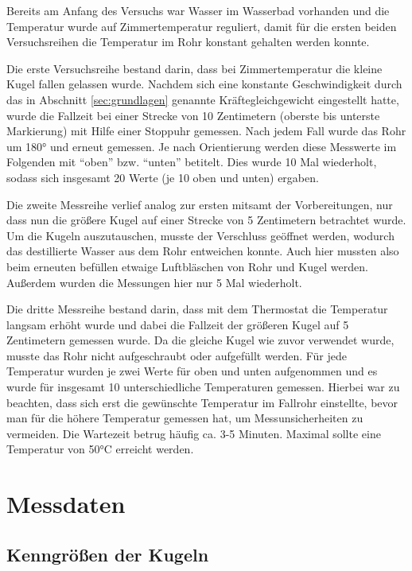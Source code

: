 Bereits am Anfang des Versuchs war Wasser im Wasserbad vorhanden und die Temperatur wurde auf Zimmertemperatur reguliert,
damit für die ersten beiden Versuchsreihen die Temperatur im Rohr konstant gehalten werden konnte.

Die erste Versuchsreihe bestand darin, dass bei Zimmertemperatur die kleine Kugel fallen gelassen wurde.
Nachdem sich eine konstante Geschwindigkeit durch das in Abschnitt \ref{sec:grundlagen} genannte Kräftegleichgewicht eingestellt hatte,
wurde die Fallzeit bei einer Strecke von 10 Zentimetern (oberste bis unterste Markierung)
mit Hilfe einer Stoppuhr gemessen.
Nach jedem Fall wurde das Rohr um 180° und erneut gemessen.
Je nach Orientierung werden diese Messwerte im Folgenden mit \enquote{oben} bzw. \enquote{unten} betitelt.
Dies wurde 10 Mal wiederholt, sodass sich insgesamt 20 Werte (je 10 oben und unten) ergaben.

Die zweite Messreihe verlief analog zur ersten mitsamt der Vorbereitungen, nur dass nun die größere Kugel auf einer Strecke von 5 Zentimetern betrachtet wurde.
Um die Kugeln auszutauschen, musste der Verschluss geöffnet werden, wodurch das destillierte Wasser aus dem Rohr entweichen konnte.
Auch hier mussten also beim erneuten befüllen etwaige Luftbläschen von Rohr und Kugel werden.
Außerdem wurden die Messungen hier nur 5 Mal wiederholt.

Die dritte Messreihe bestand darin, dass mit dem Thermostat die Temperatur langsam erhöht wurde
und dabei die Fallzeit der größeren Kugel auf 5 Zentimetern gemessen wurde.
Da die gleiche Kugel wie zuvor verwendet wurde, musste das Rohr nicht aufgeschraubt oder aufgefüllt werden.
Für jede Temperatur wurden je zwei Werte für oben und unten aufgenommen und es wurde für insgesamt 10 unterschiedliche Temperaturen gemessen.
Hierbei war zu beachten, dass sich erst die gewünschte Temperatur im Fallrohr einstellte, bevor man für die höhere Temperatur gemessen hat, 
um Messunsicherheiten zu vermeiden. Die Wartezeit betrug häufig ca. 3-5 Minuten. Maximal sollte eine Temperatur von 50°C erreicht werden.



\section{Messdaten}
\subsection{Kenngrößen der Kugeln}

